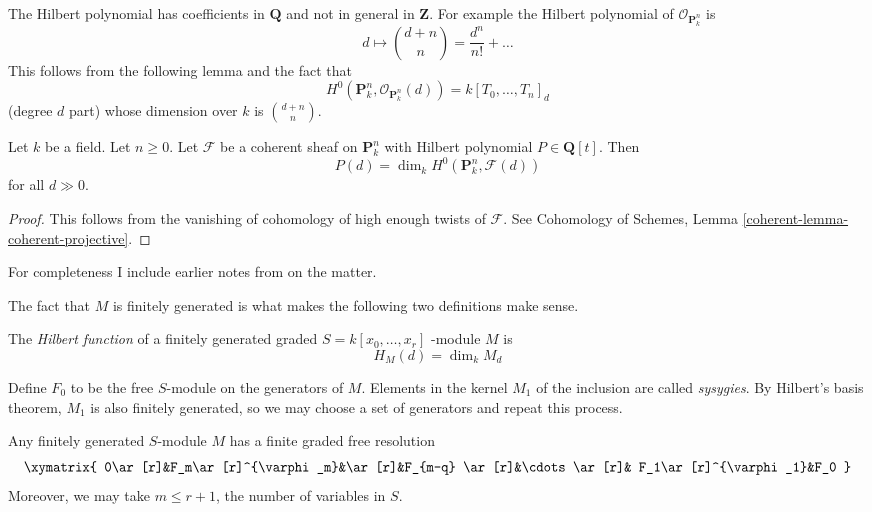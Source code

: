 \documentclass{book}
\begin{document}
\noindent
The Hilbert polynomial has coefficients in
$\mathbf{Q}$ and not
in general in $\mathbf{Z}$. For example the
Hilbert polynomial
of $\mathcal{O}_{\mathbf{P}^n_k}$ is
$$
d \longmapsto {d + n \choose n} =
\frac{d^n}{n!} + \ldots
$$
This follows from the following lemma and the
fact that
$$
H^0(\mathbf{P}^n_k,
\mathcal{O}_{\mathbf{P}^n_k}(d)) = k[T_0,
\ldots, T_n]_d
$$
(degree $d$ part) whose dimension over $k$ is
${d + n \choose n}$.

\begin{lemma}
\label{lemma-hilbert-polynomial-H0}
Let $k$ be a field. Let $n \geq 0$. Let
$\mathcal{F}$ be a coherent sheaf
on $\mathbf{P}^n_k$ with Hilbert polynomial
$P \in \mathbf{Q}[t]$.
Then
$$
P(d) = \dim_k H^0(\mathbf{P}^n_k,
\mathcal{F}(d))
$$
for all $d \gg 0$.
\end{lemma}

\begin{proof}
This follows from the vanishing of cohomology
of high enough twists
of $\mathcal{F}$. See
Cohomology of Schemes,
Lemma
\ref{coherent-lemma-coherent-projective}.
\end{proof}


\medskip\noindent
For completeness I include earlier notes
from \cite{har} on the matter.

The fact that $M$ is finitely generated is
what makes the following two
definitions make sense.

\begin{definition}
\label{definition-Hilbert-function}
The {\it Hilbert function} of a finitely
generated graded $S=k[x_0,\ldots,x_r]$
-module $M$ is
$$
H_M(d)=\dim_kM_d
$$
\end{definition}

\begin{definition}
\label{definition-sysygy}
Define $F_0$ to be the free $S$-module on the
generators of $M$. Elements in the
 kernel $M_1$ of the inclusion are called
 {\it sysygies}. By Hilbert's basis
theorem, $M_1$ is also finitely generated, so
we may choose a set of generators
and repeat this process.
\end{definition}

\begin{theorem}
\label{theorem-Hilbert-syzygy}
\begin{reference}
\cite[Theorem 1.1]{sys}
\end{reference}
Any finitely generated $S$-module $M$ has a
finite graded free resolution
$$
\xymatrix{
0\ar[r]&F_m\ar[r]^{\varphi_m}&\ar[r]&F_{m-q}
\ar[r]&\cdots\ar[r]&
F_1\ar[r]^{\varphi_1}&F_0
}
$$
Moreover, we may take $m\leq r+1$, the number
of variables in $S$.
\end{theorem}
\end{document}
